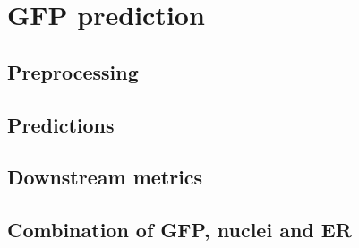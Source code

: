 \section{GFP prediction}
    \subsection{Preprocessing}
        
    \subsection{Predictions}
        
    \subsection{Downstream metrics}
        
    \subsection{Combination of GFP, nuclei and ER}
        
